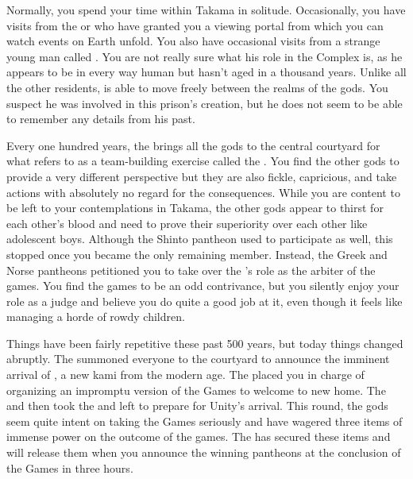 \documentclass[char]{guardians}
\begin{document}
Normally, you spend your time within Takama in solitude. Occasionally, you have visits from the \cCaretaker{} or \cWarden{} who have granted you a viewing portal from which you can watch events on Earth unfold. You also have occasional visits from a strange young man called \cJascha{\intro}. You are not really sure what his role in the Complex is, as he appears to be in every way human but hasn't aged in a thousand years. Unlike all the other residents, \cJascha{} is able to move freely between the realms of the gods. You suspect he was involved in this prison's creation, but he does not seem to be able to remember any details from his past.

Every one hundred years, the \cCaretaker{} brings all the gods to the central courtyard for what \cCaretaker{\they} refers to as a team-building exercise called the \pGames{}. You find the other gods to provide a very different perspective but they are also fickle, capricious, and take actions with absolutely no regard for the consequences. While you are content to be left to your contemplations in Takama, the other gods appear to thirst for each other's blood and need to prove their superiority over each other like adolescent boys. Although the Shinto pantheon used to participate as well, this stopped once you became the only remaining member. Instead, the Greek and Norse pantheons petitioned you to take over the \cCaretaker{}'s role as the arbiter of the games. You find the games to be an odd contrivance, but you silently enjoy your role as a judge and believe you do quite a good job at it, even though it feels like managing a horde of rowdy children.

Things have been fairly repetitive these past 500 years, but today things changed abruptly. The \cCaretaker{} summoned everyone to the courtyard to announce the imminent arrival of \cUnity{}, a new kami from the modern age. The \cCaretaker{} placed you in charge of organizing an impromptu version of the Games to welcome \cUnity{} to \cUnity{\their} new home. The \cCaretaker{} and \cWarden{} then took the \stone{} and left to prepare for Unity's arrival. This round, the gods seem quite intent on taking the Games seriously and have wagered three items of immense power on the outcome of the games. The \cCaretaker{} has secured these items and will release them when you announce the winning pantheons at the conclusion of the Games in three hours.
\end{document}
